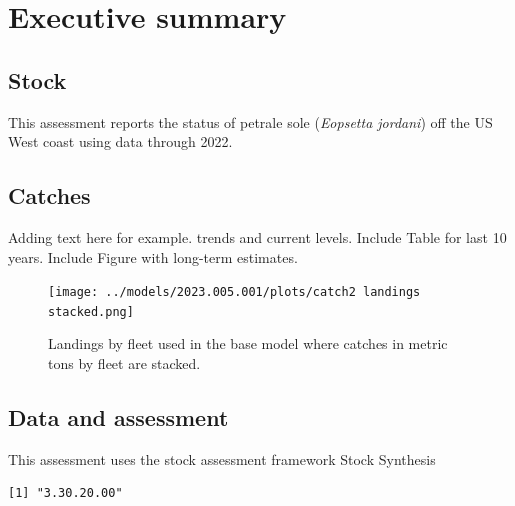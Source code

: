 \documentclass[11pt,
  english,
  letterpaper,
]{article}
\begin{document}
\pagebreak
{}
\setcounter{page}{1}

\renewcommand{\thetable}{\roman{table}}
\renewcommand{\thefigure}{\roman{figure}}

\setlength\parskip{0.5em plus 0.1em minus 0.2em}

\hypertarget{executive-summary}{%
\section*{Executive summary}\label{executive-summary}}

\hypertarget{stock}{%
\subsection*{Stock}\label{stock}}

This assessment reports the status of petrale sole (\emph{Eopsetta jordani}) off the US West coast using data through 2022.

\hypertarget{catches}{%
\subsection*{Catches}\label{catches}}

Adding text here for example. trends and current levels. Include Table for last 10 years. Include Figure with long-term estimates.

\clearpage



\begin{figure}
\centering
\texttt{[image: ../models/2023.005.001/plots/catch2 landings stacked.png]}
\caption{Landings by fleet used in the base model where catches in metric tons by fleet are stacked.\label{fig:es-catch}}
\end{figure}

\clearpage

\hypertarget{data-and-assessment}{%
\subsection*{Data and assessment}\label{data-and-assessment}}

This assessment uses the stock assessment framework Stock Synthesis

\begin{verbatim}
[1] "3.30.20.00"
\end{verbatim}
\end{document}
